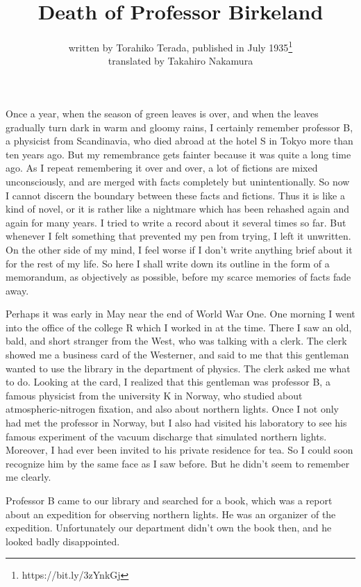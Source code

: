 \documentclass[11pt,a4j,twocolumn]{jarticle}
\title{Death of Professor Birkeland}
\author{written by Torahiko Terada,
published in July 1935\thanks{https://bit.ly/3zYnkGj}\\
translated by Takahiro Nakamura\vspace{-3pt}
}
\date{}
\begin{document}
\baselineskip=14pt

\maketitle

\noindent
Once a year, when the season of green leaves is over,
and when the leaves gradually turn dark in warm and gloomy rains, 
I certainly remember professor B, a physicist from Scandinavia, 
who died abroad at the hotel S in Tokyo more than ten years ago.
But my remembrance gets fainter because it was quite a long time ago.
As I repeat remembering it over and over, 
a lot of fictions are mixed unconsciously,
and are merged with facts completely but unintentionally.
So now I cannot discern the boundary between these facts and fictions.
Thus it is like a kind of novel, or it is rather like a nightmare which has been
rehashed again and again for many years.
I tried to write a record about it several times so far.
But whenever I felt something that prevented my pen from trying,
I left it unwritten. On the other side of my mind, I feel worse
if I don't write anything brief about it for the rest of my life.
So here I shall write down its outline in the form of a memorandum, 
as objectively as possible, before my scarce memories of facts fade away.

Perhaps it was early in May near the end of World War One.
One morning I went into the office of the college R which
I worked in at the time. There I saw an old, bald, and short stranger 
from the West, who was talking with a clerk.
The clerk showed me a business card of the Westerner, and
said to me that this gentleman wanted to use the library in the department of physics.
The clerk asked me what to do. Looking at the card, I realized that this gentleman was 
professor B, a famous physicist from the university K in Norway,
who studied about atmospheric-nitrogen fixation,
and also about northern lights.
Once I not only had met the professor in Norway, but I also
had visited his laboratory to see his famous experiment of 
the vacuum discharge that simulated northern lights.
Moreover, I had ever been invited to his private residence for tea.
So I could soon recognize him by the same face as I saw before.
But he didn't seem to remember me clearly.

Professor B came to our library and searched for a book,
which was a report about an expedition for observing northern lights.
He was an organizer of the expedition.
Unfortunately our department didn't own the book then,
and he looked badly disappointed.
\end{document}
